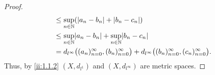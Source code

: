 \begin{proof}
\begin{align*}
                                                                     & \leq \sup_{n \in \N} (\abs{a_n - b_n} + \abs{b_n - c_n})                                                                               \\
                                                                     & \leq \sup_{n \in \N} \abs{a_n - b_n} + \sup_{n \in \N} \abs{b_n - c_n}                                                                 \\
                                                                     & = d_{l^\infty}\big((a_n)_{n = 0}^\infty, (b_n)_{n = 0}^\infty\big) + d_{l^\infty}\big((b_n)_{n = 0}^\infty, (c_n)_{n = 0}^\infty\big).
  \end{align*}
  Thus, by \cref{ii:1.1.2} \((X, d_{l^1})\) and \((X, d_{l^\infty})\) are metric spaces.


\end{proof}
